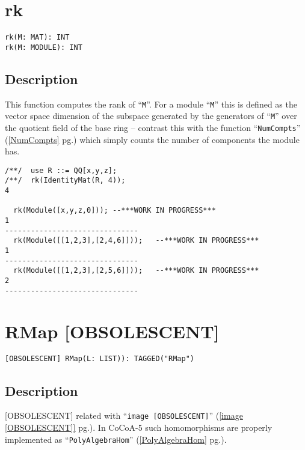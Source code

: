 \documentclass[a4paper]{mybook}
\newenvironment{command}{}{} %
\begin{document}
\section{rk}
\label{rk}
\begin{command} %


\begin{Verbatim}[label=syntax, rulecolor=\color{MidnightBlue},
frame=single]
rk(M: MAT): INT
rk(M: MODULE): INT
\end{Verbatim}


\subsection*{Description}

This function computes the rank of ``\verb&M&''.  For a module ``\verb&M&'' this is defined
as the vector space dimension of the subspace generated by the generators
of ``\verb&M&'' over the quotient field of the base ring -- contrast this with the
function ``\verb&NumCompts&'' (\ref{NumCompts} pg.\pageref{NumCompts}) which simply counts the number of
components the module has.
\begin{Verbatim}[label=example, rulecolor=\color{PineGreen}, frame=single]
/**/  use R ::= QQ[x,y,z];
/**/  rk(IdentityMat(R, 4));
4

  rk(Module([x,y,z,0])); --***WORK IN PROGRESS***
1
-------------------------------
  rk(Module([[1,2,3],[2,4,6]]));   --***WORK IN PROGRESS***
1
-------------------------------
  rk(Module([[1,2,3],[2,5,6]]));   --***WORK IN PROGRESS***
2
-------------------------------
\end{Verbatim}


\end{command} %

\section{RMap [OBSOLESCENT]}
\label{RMap [OBSOLESCENT]}
\begin{command} %


\begin{Verbatim}[label=syntax, rulecolor=\color{MidnightBlue},
frame=single]
[OBSOLESCENT] RMap(L: LIST)): TAGGED("RMap")
\end{Verbatim}


\subsection*{Description}

[OBSOLESCENT] related with ``\verb&image [OBSOLESCENT]&'' (\ref{image [OBSOLESCENT]} pg.\pageref{image [OBSOLESCENT]}).
In CoCoA-5 such homomorphisms are properly implemented as ``\verb&PolyAlgebraHom&'' (\ref{PolyAlgebraHom} pg.\pageref{PolyAlgebraHom}).

\end{command} %
\end{document}
